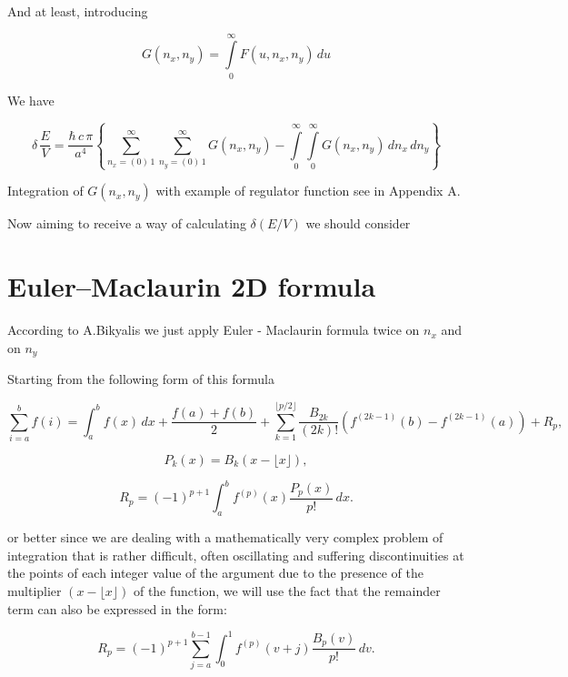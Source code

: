 \documentclass[11pt]{article}
\begin{document}
    And at least, introducing

    \begin{equation}
G\left(n_x, n_y\right) = \int\limits_{0}^{\infty}F\left(u, n_x, n_y\right)\,d{u}
\end{equation}

    We have

    \begin{equation}
\delta\,\frac{E}{V} = \frac{\hbar\,c\,\pi}{a^4}
\left\{
\sum\limits_{n_x=\left(0\right)\,1}^{\infty}
\sum\limits_{n_y=\left(0\right)\,1}^{\infty}
G\left(n_x, n_y\right)
-
\int\limits_{0}^{\infty}
\int\limits_{0}^{\infty}
G\left(n_x, n_y\right)
\,d{n_x}\,d{n_y}
\right\}
\end{equation}

Integration of \(G\left(n_x, n_y\right)\) with example of regulator
function see in Appendix A.

    Now aiming to receive a way of calculating \(\delta\left(E/V\right)\) we
should consider

\section{Euler--Maclaurin 2D formula}\label{eulermaclaurin-2d-formula}

According to A.Bikyalis \cite{Bikyalis1968} we just apply Euler -
Maclaurin formula twice on \(n_x\) and on \(n_y\)

Starting from the following form of this formula

\[{\displaystyle \sum _{i=a}^{b}f(i)=\int _{a}^{b}f(x)\,dx+{\frac {f(a)+f(b)}{2}}+\sum _{k=1}^{\lfloor p/2\rfloor }{\frac {B_{2k}}{(2k)!}}\left(f^{(2k-1)}(b)-f^{(2k-1)}(a)\right)+R_{p},}\]

\[{\displaystyle P_{k}(x)=B_{k}\left(x-\lfloor x\rfloor \right),}\]

\[{\displaystyle R_{p}=(-1)^{p+1}\int _{a}^{b}f^{(p)}(x){\frac {P_{p}(x)}{p!}}\,dx.}\]

or better since we are dealing with a mathematically very complex
problem of integration that is rather difficult, often oscillating and
suffering discontinuities at the points of each integer value of the
argument due to the presence of the multiplier \((x-\lfloor x\rfloor )\)
of the function, we will use the fact that the remainder term can also
be expressed in the form:

\[{\displaystyle R_{p}=(-1)^{p+1}\sum_{j=a}^{b-1} \int _{0}^{1}f^{(p)}(v+j){\frac {B_{p}(v)}{p!}}\,dv.}\]
\end{document}
